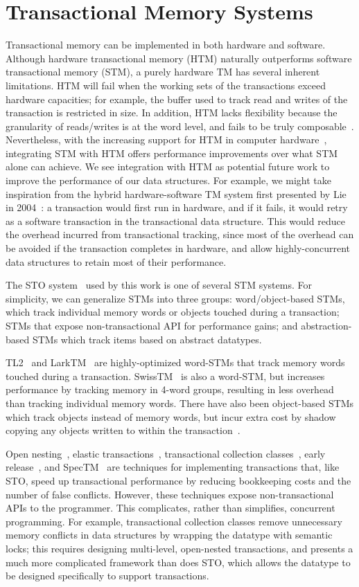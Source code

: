 \section{Transactional Memory Systems}
Transactional memory can be implemented in both hardware and software. Although hardware transactional memory (HTM) naturally outperforms software transactional memory (STM), a purely hardware TM has several inherent limitations. HTM will fail when the working sets of the transactions exceed hardware capacities; for example, the buffer used to track read and writes of the transaction is restricted in size. In addition, HTM lacks flexibility because the granularity of reads/writes is at the word level, and fails to be truly composable~\cite{htm}. Nevertheless, with the increasing support for HTM in computer hardware~\cite{intel_htm}, integrating STM with HTM offers performance improvements over what STM alone can achieve. We see integration with HTM as potential future work to improve the performance of our data structures. For example, we might take inspiration from the hybrid hardware-software TM system first presented by Lie in 2004~\cite{lie}: a transaction would first run in hardware, and if it fails, it would retry as a software transaction in the transactional data structure. This would reduce the overhead incurred from transactional tracking, since most of the overhead can be avoided if the transaction completes in hardware, and allow highly-concurrent data structures to retain most of their performance.

The STO system~\cite{sto} used by this work is one of several STM systems. For simplicity, we can generalize STMs into three groups: word/object-based STMs, which track individual memory words or objects touched during a transaction; STMs that expose non-transactional API for performance gains; and abstraction-based STMs which track items based on abstract datatypes.

TL2~\cite{tl2} and LarkTM~\cite{larktm} are highly-optimized word-STMs that track memory words touched during a transaction. SwissTM~\cite{swisstm} is also a word-STM, but increases performance by tracking memory in 4-word groups, resulting in less overhead than tracking individual memory words. There have also been object-based STMs which track objects instead of memory words, but incur extra cost by shadow copying any objects written to within the transaction~\cite{stm_objects}. 

Open nesting~\cite{opennesting}, elastic transactions~\cite{elastic}, transactional collection classes~\cite{tcc}, early release~\cite{earlyrelease}, and SpecTM~\cite{spectm} are techniques for implementing transactions that, like STO, speed up transactional performance by reducing bookkeeping costs and the number of false conflicts. However, these techniques expose non-transactional APIs to the programmer. This complicates, rather than simplifies, concurrent programming. For example, transactional collection classes remove unnecessary memory conflicts in data structures by wrapping the datatype with semantic locks; this requires designing multi-level, open-nested transactions, and presents a much more complicated framework than does STO, which allows the datatype to be designed specifically to support transactions.

